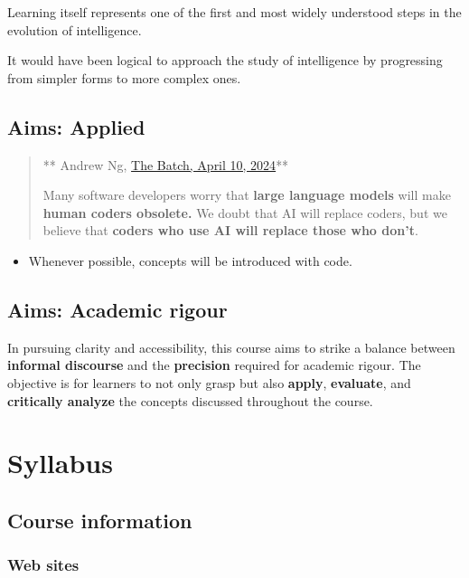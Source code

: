 \documentclass[
  letterpaper,
  DIV=11,
  numbers=noendperiod]{scrartcl}
\providecommand{\tightlist}{%
  \setlength{\itemsep}{0pt}\setlength{\parskip}{0pt}}
\begin{document}
Learning itself represents one of the first and most widely understood
steps in the evolution of intelligence.

It would have been logical to approach the study of intelligence by
progressing from simpler forms to more complex ones.

\subsection{Aims: Applied}\label{aims-applied}

\begin{quote}
** Andrew Ng,
\href{https://info.deeplearning.ai/autonomous-coding-agents-instability-at-stability-ai-mamba-mania-what-users-do-with-genai-2}{The
Batch, April 10, 2024}**

Many software developers worry that \textbf{large language models} will
make \textbf{human coders obsolete.} We doubt that AI will replace
coders, but we believe that \textbf{coders who use AI will replace those
who don't}.
\end{quote}

\begin{itemize}
\tightlist
\item
  Whenever possible, concepts will be introduced with code.
\end{itemize}

\subsection{Aims: Academic rigour}\label{aims-academic-rigour}

In pursuing clarity and accessibility, this course aims to strike a
balance between \textbf{informal discourse} and the \textbf{precision}
required for academic rigour. The objective is for learners to not only
grasp but also \textbf{apply}, \textbf{evaluate}, and \textbf{critically
analyze} the concepts discussed throughout the course.

\section{Syllabus}\label{syllabus}

\subsection{Course information}\label{course-information}

\subsubsection{Web sites}\label{web-sites}
\end{document}
